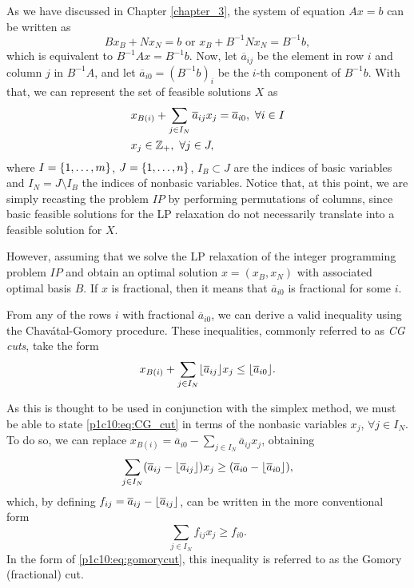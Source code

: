 As we have discussed in Chapter \ref{chapter_3}, the system of equation $Ax= b$ can be written as
%
\begin{equation*}
	Bx_B + Nx_N = b \text{ or } x_B + B^{-1}Nx_N = B^{-1}b,
\end{equation*}
%
which is equivalent to $B^{-1}Ax = B^{-1}b$. Now, let $\overline{a}_{ij}$ be the element in row $i$ and column $j$ in $B^{-1}A$, and let $\overline{a}_{i0} = (B^{-1}b)_i$ be the $i$-th component of $B^{-1}b$. With that, we can represent the set of feasible solutions $X$ as
%
\begin{align*}
	&x_{B(i)} + \sum_{j \in I_N} \overline{a}_{ij}x_j = \overline{a}_{i0}, \ \forall i \in I\\
	&x_j \in \mathbb{Z}_+, \ \forall j \in J,
\end{align*}
%
where $I = \left\{ 1, \dots, m \right \}$, $J = \left\{ 1, \dots, n \right \}$, $I_B \subset J$ are the indices of basic variables and $I_N = J \setminus I_B$ the indices of nonbasic variables. Notice that, at this point, we are simply recasting the problem $IP$ by performing permutations of columns, since basic feasible solutions for the LP relaxation do not necessarily translate into a feasible solution for $X$.

However, assuming that we solve the LP relaxation of the integer programming problem $IP$ and obtain an optimal solution $x = (x_B, x_N)$ with associated optimal basis $B$. If $x$ is fractional, then it means that $\overline{a}_{i0}$ is fractional for some $i$.

From any of the rows $i$ with fractional $\overline{a}_{i0}$, we can derive a valid inequality using the Chav\'atal-Gomory procedure. These inequalities, commonly referred to as \emph{CG cuts}, take the form
%
\begin{equation}
	x_{B(i)} + \sum_{j \in I_N} \lfloor \overline{a}_{ij} \rfloor x_j \leq \lfloor \overline{a}_{i0} \rfloor. \label{p1c10:eq:CG_cut}	
\end{equation}

As this is thought to be used in conjunction with the simplex method, we must be able to state \eqref{p1c10:eq:CG_cut} in terms of the nonbasic variables $x_j$, $\forall j \in I_N$. To do so, we can replace $x_{B(i)} = \overline{a}_{i0} - \sum_{j \in I_N} \overline{a}_{ij}x_j$, obtaining
%
\begin{equation*}
	\sum_{j \in I_N} (\overline{a}_{ij} - \lfloor \overline{a}_{ij} \rfloor)x_j \geq (\overline{a}_{i0} - \lfloor \overline{a}_{i0} \rfloor),
\end{equation*}
%
which, by defining $f_{ij} = \overline{a}_{ij} - \lfloor \overline{a}_{ij} \rfloor$, can be written in the more conventional form
%
\begin{equation}
	\sum_{j \in I_N} f_{ij}x_j \geq f_{i0}. \label{p1c10:eq:gomorycut}
\end{equation}
%
In the form of \eqref{p1c10:eq:gomorycut}, this inequality is referred to as the Gomory (fractional) cut. 

